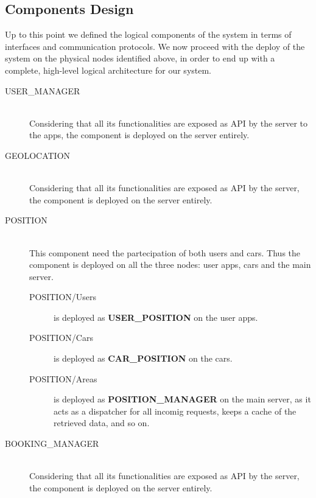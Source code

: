 \documentclass[11pt]{article} %
\begin{document}
\subsection{Components Design}

Up to this point we defined the logical components of the system in terms of interfaces and communication protocols. We now proceed with the deploy of the system on the physical nodes identified above, in order to end up with a complete, high-level logical architecture for our system.

\begin{description}
	\item[USER\_MANAGER] \hfill \\
	Considering that all its functionalities are exposed as API by the server to the apps, the component is deployed on the server entirely.
		
	\item[GEOLOCATION] \hfill \\
	Considering that all its functionalities are exposed as API by the server, the component is deployed on the server entirely.

	\item[POSITION] \hfill \\
	This component need the partecipation of both users and cars. Thus the component is deployed on all the three nodes:  user apps, cars and the main server.
	\begin{description}
		\item[POSITION/Users] is deployed as \textbf{USER\_POSITION} on the user apps.
		\item[POSITION/Cars] is deployed as \textbf{CAR\_POSITION} on the cars.
		\item[POSITION/Areas] is deployed as \textbf{POSITION\_MANAGER} on the main server, as it acts as a dispatcher for all incomig requests, keeps a cache of the retrieved data, and so on.
	\end{description}
	
	\item[BOOKING\_MANAGER] \hfill \\
	Considering that all its functionalities are exposed as API by the server, the component is deployed on the server entirely.
	

\end{description}
\end{document}
